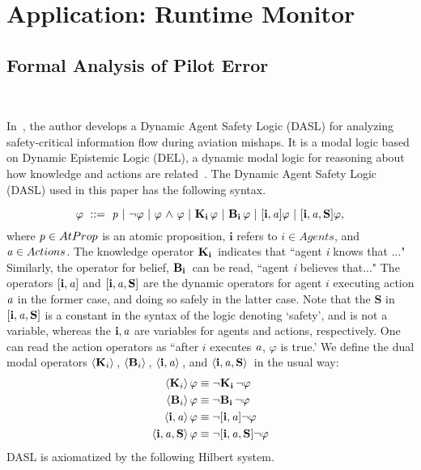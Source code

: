 \chapter{Application: Runtime Monitor}
	\label{CH_05}
\section{Formal Analysis of Pilot Error}~\label{formal}

In~\cite{AhrenbachNFM}, the author develops a Dynamic Agent Safety Logic (DASL) for analyzing safety-critical information flow during aviation mishaps. It is a modal logic based on Dynamic Epistemic Logic (DEL), a dynamic modal logic for reasoning about how knowledge and actions are related~\cite{DEL}. The Dynamic Agent Safety Logic (DASL) used in this paper has the following syntax.

	$$ \varphi \ ::=\   \mathit{p}  \ |\  {\neg} \varphi \ |\  \varphi {\ \wedge \ } \varphi  \ |\  \mathbf{K}_{\mathbf{i}}\, \varphi \ |\  \mathbf{B}_{\mathbf{i}}\,\varphi \ |\  \mathbf{[{i, \mathit{a}}]}\varphi \ |\  \mathbf{[{i,\mathit{a},S}]}\varphi,$$
where $\mathit{p} \in AtProp$ is an atomic proposition, $\mathbf{i}$ refers
to $i \in Agents$, and $\mathbf{\mathit{a}} \in Actions$. The knowledge operator
$\mathbf{K}_{\mathbf{i}}\,$ indicates that ``agent \emph{i} knows that ..." Similarly,
the operator for belief, $\mathbf{B}_{\mathbf{i}}\,$ can be read, ``agent \emph{i}
believes that..." The operators $\mathbf{[{i,\mathit{a}}]}$ and
$\mathbf{[{i,\mathit{a},S}]}$ are the dynamic operators for agent $i$ executing
action $\mathit{a}$ in the former case, and
doing so safely in the latter case. Note that the $\mathbf{S}$ in
$\mathbf{[{i,\mathit{a},S}]}$ is a constant in the syntax of the logic denoting
`safety', and is not a variable, whereas the $\mathbf{i,\mathit{a}}$ are
variables for agents and actions,
respectively. One can read the action operators as ``after $i$
executes $\mathit{a}$, $\varphi$ is true.'  We define the dual modal
operators $\langle \mathbf{K}_{i} \rangle\,$, $\langle \mathbf{B}_{i} \rangle\,$, $\mathbf{\langle i, \mathit{a} \rangle}\,$, and
$\mathbf{\langle i, \mathit{a},\mathbf{S} \rangle}\,$ in the usual way:
\begin{align*}
\langle \mathbf{K}_{i} \rangle\,\varphi &\equiv {\neg} \mathbf{K}_{\mathbf{i}}\, {\neg} \varphi \\
\langle \mathbf{B}_{i} \rangle\, \varphi &\equiv {\neg} \mathbf{B}_{\mathbf{i}}\, {\neg} \varphi \\
\mathbf{\langle i, \mathit{a} \rangle}\,\varphi &\equiv {\neg} \mathbf{[{i, \mathit{a}}]} {\neg} \varphi \\
\mathbf{\langle i, \mathit{a},\mathbf{S} \rangle}\,\varphi &\equiv {\neg} \mathbf{[{i,\mathit{a},S}]}{\neg} \varphi
\end{align*} 
DASL is axiomatized by the following Hilbert system.\\

